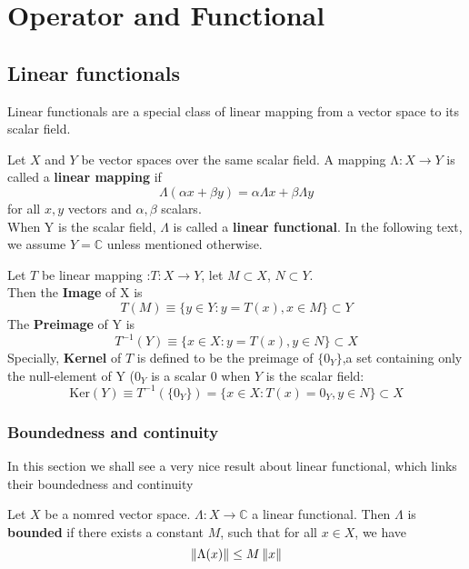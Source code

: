 \newpage
\section{Operator and Functional}
\subsection{Linear functionals}\label{Linear Functionals}
Linear functionals are a special class of linear mapping from a vector space to its scalar field.

\begin{definition}\rm\nextline
	Let $X$ and $Y$ be vector spaces over the same scalar field. A mapping $\mathrm{\Lambda}:X\xrightarrow{}Y$ is called a {\bf linear mapping} if
	$$
		\Lambda({\alpha x+\beta y})=\alpha\Lambda{x}+\beta \Lambda{y}
	$$
	for all $x,y$ vectors and $\alpha,\beta $ scalars.\\
	When Y is the scalar field, $\Lambda$ is called a {\bf{linear functional}}. In the following text, we assume $Y=\mathbb{C}$ unless mentioned otherwise.
\end{definition}

\begin{definition}\rm\nextline
	Let $T$ be linear mapping :$T:X\xrightarrow{}Y$, let $M\subset X$, $N\subset Y$.\\
	Then the {\bf Image} of X is
	$$
		T(M)\equiv \{y\in Y: y=T(x),x\in M\}\subset Y
	$$
	The {\bf Preimage} of Y is
	$$
		T^{-1}(Y)\equiv \{x\in X: y=T(x),y\in N\}\subset X
	$$
	Specially, {\bf Kernel} of $T$ is defined to be the preimage of $\{0_Y\}$,a set containing only the null-element of Y ($0_Y$ is a scalar 0 when $Y$ is the scalar field:
	$$
		\text{Ker}(Y)\equiv T^{-1}(\{0_Y\})=\{x\in X: T(x)=0_Y,y\in N\}\subset X
	$$
\end{definition}

\subsubsection{Boundedness and continuity}
In this section we shall see a very nice result about linear functional, which links their boundedness and continuity

\begin{definition}[Boundedness]\rm\nextline
	Let $X$ be a nomred vector space. $\Lambda:X\xrightarrow{}\mathbb{C}$ a linear functional. Then $\Lambda$ is {\bf bounded} if there exists a constant $M$, such that for all $x\in X$, we have $$\left\|{\Lambda(x)}\right\|\leq M\left\|{x}\right\|$$


\end{definition}

